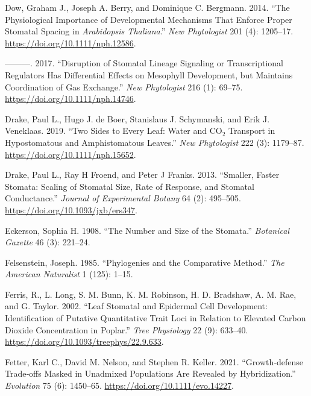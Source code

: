 \documentclass[
  12pt,
]{article}
\newlength{\cslhangindent}
\newlength{\cslentryspacingunit} %
\newenvironment{CSLReferences}[2] %
 {%
  \setlength{\parindent}{0pt}
  \ifodd #1
  \let\oldpar\par
  \def\par{\hangindent=\cslhangindent\oldpar}
  \fi
  \setlength{\parskip}{#2\cslentryspacingunit}
 }%
 {}
\begin{document}
\begin{CSLReferences}{1}{0}
\leavevmode{}%
Dow, Graham J., Joseph A. Berry, and Dominique C. Bergmann. 2014. {``The Physiological Importance of Developmental Mechanisms That Enforce Proper Stomatal Spacing in \emph{{Arabidopsis} Thaliana}.''} \emph{New Phytologist} 201 (4): 1205--17. \url{https://doi.org/10.1111/nph.12586}.

\leavevmode{}%
---------. 2017. {``Disruption of Stomatal Lineage Signaling or Transcriptional Regulators Has Differential Effects on Mesophyll Development, but Maintains Coordination of Gas Exchange.''} \emph{New Phytologist} 216 (1): 69--75. \url{https://doi.org/10.1111/nph.14746}.

\leavevmode{}%
Drake, Paul L., Hugo J. de Boer, Stanislaus J. Schymanski, and Erik J. Veneklaas. 2019. {``Two Sides to Every Leaf: Water and {CO}\(_{\textrm{2}}\) Transport in Hypostomatous and Amphistomatous Leaves.''} \emph{New Phytologist} 222 (3): 1179--87. \url{https://doi.org/10.1111/nph.15652}.

\leavevmode{}%
Drake, Paul L., Ray H Froend, and Peter J Franks. 2013. {``Smaller, Faster Stomata: Scaling of Stomatal Size, Rate of Response, and Stomatal Conductance.''} \emph{Journal of Experimental Botany} 64 (2): 495--505. \url{https://doi.org/10.1093/jxb/ers347}.

\leavevmode{}%
Eckerson, Sophia H. 1908. {``The Number and Size of the Stomata.''} \emph{Botanical Gazette} 46 (3): 221--24.

\leavevmode{}%
Felsenstein, Joseph. 1985. {``Phylogenies and the Comparative Method.''} \emph{The American Naturalist} 1 (125): 1--15.

\leavevmode{}%
Ferris, R., L. Long, S. M. Bunn, K. M. Robinson, H. D. Bradshaw, A. M. Rae, and G. Taylor. 2002. {``Leaf Stomatal and Epidermal Cell Development: Identification of Putative Quantitative Trait Loci in Relation to Elevated Carbon Dioxide Concentration in Poplar.''} \emph{Tree Physiology} 22 (9): 633--40. \url{https://doi.org/10.1093/treephys/22.9.633}.

\leavevmode{}%
Fetter, Karl C., David M. Nelson, and Stephen R. Keller. 2021. {``Growth‐defense Trade‐offs Masked in Unadmixed Populations Are Revealed by Hybridization.''} \emph{Evolution} 75 (6): 1450--65. \url{https://doi.org/10.1111/evo.14227}.


\end{CSLReferences}
\end{document}
